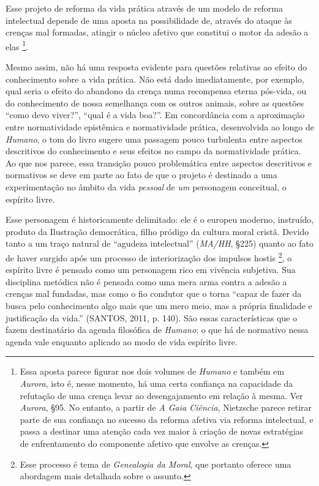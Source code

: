 \documentclass[
	12pt,				%
	openright,			%
	oneside,			%
	a4paper,			%
	english,			%
	french,				%
	spanish,			%
	brazil				%
	]{abntex2}
\begin{document}
	Esse projeto de reforma da vida prática através de um modelo de reforma intelectual depende de uma aposta na possibilidade de, através do ataque às crenças mal formadas, atingir o núcleo afetivo que constitui o motor da adesão a elas
\footnote{Essa aposta parece figurar nos dois volumes de \textit{Humano} e também em \textit{Aurora}, isto é, nesse momento, há uma certa confiança na capacidade da refutação de uma crença levar ao desengajamento em relação à mesma. Ver \textit{Aurora}, §95. No entanto, a partir de \textit{A Gaia Ciência}, Nietzsche parece retirar parte de sua confiança no sucesso da reforma afetiva via reforma intelectual, e passa a destinar uma atenção cada vez maior à criação de novas estratégias de enfrentamento do componente afetivo que envolve as crenças.}. 
	
	Mesmo assim, não há uma resposta evidente para questões relativas ao efeito do conhecimento sobre a vida prática. Não está dado imediatamente, por exemplo, qual seria o efeito do abandono da crença numa recompensa eterna pós-vida, ou do conhecimento de nossa semelhança com os outros animais, sobre as questões “como devo viver?”, “qual é a vida boa?”. Em concordância com a aproximação entre normatividade epistêmica e normatividade prática, desenvolvida ao longo de \textit{Humano}, o tom do livro sugere uma passagem pouco turbulenta entre aspectos descritivos do conhecimento e seus efeitos no campo da normatividade prática. Ao que nos parece, essa transição pouco problemática entre aspectos descritivos e normativos se deve em parte ao fato de que o projeto é destinado a uma experimentação no âmbito da vida \textit{pessoal} de \textit{um} personagem conceitual, o espírito livre.

Esse personagem é historicamente delimitado: ele é o europeu moderno, instruído, produto da Ilustração democrática, filho pródigo da cultura moral cristã. Devido tanto a um traço natural de “agudeza intelectual” (\textit{MA/HH}, §225) quanto ao fato de haver surgido após um processo de interiorização dos impulsos hostis
\footnote{Esse processo é tema de \textit{Genealogia da Moral}, que portanto oferece uma abordagem mais detalhada sobre o assunto.}, 
o espírito livre é pensado como um personagem rico em vivência subjetiva. Sua disciplina metódica não é pensada como uma mera arma contra a adesão a crenças mal fundadas, mas como o fio condutor que o torna “capaz de fazer da busca pelo conhecimento algo mais que um mero meio, mas a própria finalidade e justificação da vida.” (SANTOS, 2011, p. 140). São essas características que o fazem destinatário da agenda filosófica de \textit{Humano}; o que há de normativo nessa agenda vale enquanto aplicado ao modo de vida espírito livre.
\end{document}

